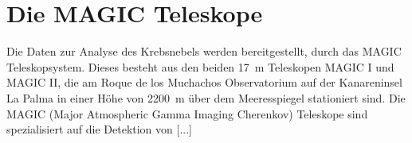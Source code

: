 \section{Die MAGIC Teleskope}
\label{sec:teleskop}

Die Daten zur Analyse des Krebsnebels werden bereitgestellt, durch das MAGIC
Teleskopsystem. Dieses besteht aus den beiden \SI{17}{\metre} Teleskopen MAGIC I
und MAGIC II, die am Roque de los Muchachos Observatorium auf der Kanareninsel
La Palma in einer Höhe von \SI{2200}{\metre} über dem Meeresspiegel stationiert
sind. Die MAGIC (Major Atmospheric Gamma Imaging Cherenkov) Teleskope sind
spezialisiert auf die Detektion von [...]


